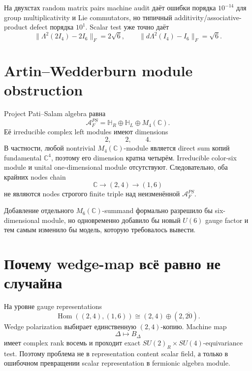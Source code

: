 На двухстах random matrix pairs machine audit даёт ошибки порядка
\(10^{-14}\) для group multiplicativity и Lie commutators, но типичный
additivity/associative-product defect порядка \(10^1\). Scalar test уже
точно даёт
\begin{equation}
 \|\Lambda^2(2I_4)-2I_6\|_F=2\sqrt6,
 \qquad
 \|d\Lambda^2(I_4)-I_6\|_F=\sqrt6.
\end{equation}

\section{Artin--Wedderburn module obstruction}

Project Pati--Salam algebra равна
\begin{equation}
 \mathcal A_F^{PS}
 =\mathbb H_R\oplus\mathbb H_L\oplus M_4(\mathbb C).
\end{equation}
Её irreducible complex left modules имеют dimensions
\begin{equation}
 2,\qquad2,\qquad4.
\end{equation}
В частности, любой nontrivial \(M_4(\mathbb C)\)-module является direct sum
копий fundamental \(\mathbb C^4\), поэтому его dimension кратна четырём.
Irreducible color-six module и unital one-dimensional module отсутствуют.
Следовательно, оба крайних nodes chain
\begin{equation}
 \mathbb C\longrightarrow(2,4)\longrightarrow(1,6)
\end{equation}
не являются nodes строгого finite triple над неизменённой
\(\mathcal A_F^{PS}\).

Добавление отдельного \(M_6(\mathbb C)\)-summand формально разрешило бы
six-dimensional module, но одновременно добавило бы новый \(U(6)\) gauge
factor и тем самым изменило бы модель, которую требовалось вывести.

\section{Почему wedge-map всё равно не случайна}

На уровне gauge representations
\begin{equation}
 \operatorname{Hom}((2,4),(1,6))
 \cong(2,4)\oplus(2,\overline{20}).
\end{equation}
Wedge polarization выбирает единственную \((2,4)\)-копию. Machine map
\begin{equation}
 \Delta\longmapsto B_\Delta
\end{equation}
имеет complex rank восемь и проходит exact
\(SU(2)_R\times SU(4)\)-equivariance test. Поэтому проблема не в
representation content scalar field, а только в ошибочном превращении
scalar representation в fermionic algebra module.

